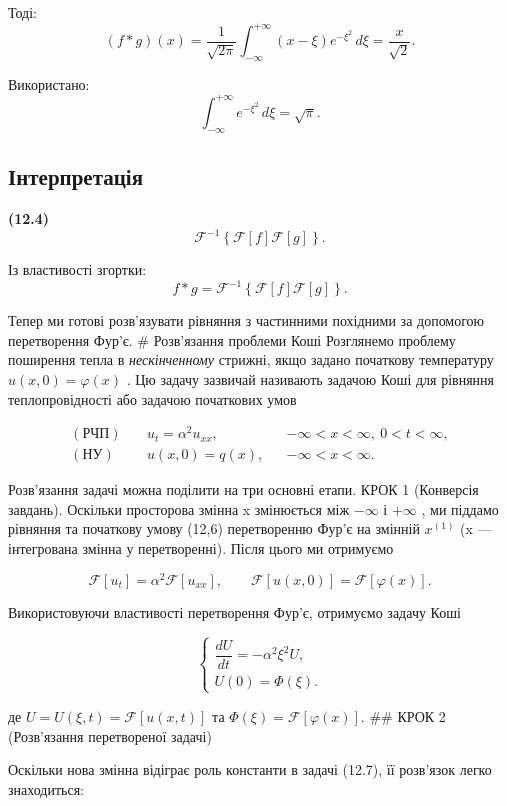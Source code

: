Тоді: \[
(f*g)(x) = \frac{1}{\sqrt{2\pi}} \int_{-\infty}^{+\infty} (x-\xi)e^{-\xi^2}\,d\xi = \frac{x}{\sqrt{2}}.
\]

Використано: \[
\int_{-\infty}^{+\infty} e^{-\xi^2}\,d\xi = \sqrt{\pi}.
\]

\subsection{Інтерпретація}\label{ux456ux43dux442ux435ux440ux43fux440ux435ux442ux430ux446ux456ux44f}

\textbf{(12.4)} \[
\mathcal{F}^{-1}\left\{\mathcal{F}[f]\mathcal{F}[g]\right\}.
\]

Із властивості згортки: \[
f * g = \mathcal{F}^{-1}\left\{\mathcal{F}[f]\mathcal{F}[g]\right\}.
\]

Тепер ми готові розв'язувати рівняння з частинними похідними за допомогою перетворення Фур'є. \# Розв'язання проблеми Коші Розглянемо проблему поширення тепла в \emph{нескінченному} стрижні, якщо задано початкову температуру \(u(x, 0) = \varphi(x)\) . Цю задачу зазвичай називають задачою Коші для рівняння теплопровідності або задачою початкових умов

\[
\begin{aligned}
(\text{РЧП})\quad & u_t=\alpha^2u_{xx}, && -\infty<x<\infty,\ 0<t<\infty,\\
(\text{НУ})\quad & u(x,0)=q(x), && -\infty<x<\infty.
\end{aligned}
\]

Розв'язання задачі можна поділити на три основні етапи. КРОК 1 (Конверсія завдань). Оскільки просторова змінна x змінюється між \(-\infty\) і \(+\infty\) , ми піддамо рівняння та початкову умову (12,6) перетворенню Фур'є на змінній \(x^{(1)}\) (x --- інтегрована змінна у перетворенні). Після цього ми отримуємо

\[
\mathcal{F}[u_t] = \alpha^2 \mathcal{F}[u_{xx}],\qquad
\mathcal{F}[u(x,0)] = \mathcal{F}[\varphi(x)].
\]

Використовуючи властивості перетворення Фур'є, отримуємо задачу Коші

\[
\begin{cases}
\dfrac{dU}{dt}=-\alpha^2\xi^2U,\\
U(0)=\Phi(\xi).
\end{cases}
\]

де \(U=U(\xi,t)=\mathcal{F}[u(x,t)]\) та \(\Phi(\xi)=\mathcal{F}[\varphi(x)]\). \#\# КРОК 2 (Розв'язання перетвореної задачі)

Оскільки нова змінна відіграє роль константи в задачі (12.7), її розв'язок легко знаходиться:

